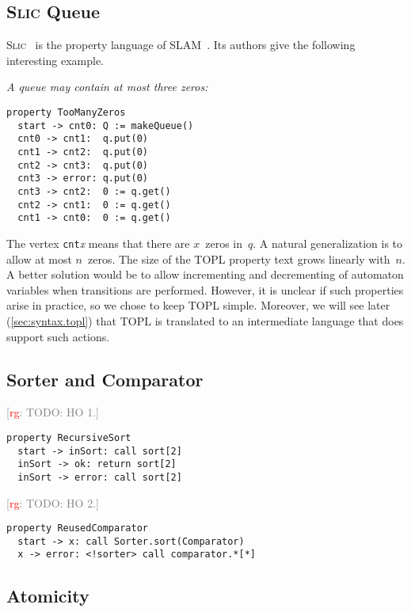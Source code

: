 \documentclass[preprint]{sigplanconf} %
\newcommand{\note}[2]{\textcolor{gray}{[\textcolor{red}{#1}: #2]}}
\newcommand{\rg}[1]{\note{rg}{#1}}
\newcommand{\delimitVerbatim}{\par\nobreak\smallskip\noindent}
\theoremstyle{definition}
\theoremstyle{remark}
\begin{document}
\subsection{\textsc{Slic} Queue} %

\textsc{Slic}~\cite{ball2002} is the property language of SLAM~\cite{dblp:conf/cav/ballr01}.
Its authors give the following interesting example.

\medskip\emph{A queue may contain at most three zeros:}
\delimitVerbatim
\begin{Verbatim}
property TooManyZeros
  start -> cnt0: Q := makeQueue()
  cnt0 -> cnt1:  q.put(0)
  cnt1 -> cnt2:  q.put(0)
  cnt2 -> cnt3:  q.put(0)
  cnt3 -> error: q.put(0)
  cnt3 -> cnt2:  0 := q.get()
  cnt2 -> cnt1:  0 := q.get()
  cnt1 -> cnt0:  0 := q.get()
\end{Verbatim}
\delimitVerbatim
The vertex \texttt{cnt}\textit{x} means that there are $x$~zeros in~$q$.
A natural generalization is to allow at most $n$~zeros.
The size of the TOPL property text grows linearly with~$n$.
A better solution would be to allow incrementing and decrementing of automaton variables when transitions are performed.
However, it is unclear if such properties arise in practice, so we chose to keep TOPL simple.
Moreover, we will see later (\autoref{sec:syntax.topl}) that TOPL is translated to an intermediate language that does support such actions.

\subsection{Sorter and Comparator}\label{sec:examples.sorter} %

\rg{TODO: HO 1.}
\par\medskip\noindent
\begin{Verbatim}
property RecursiveSort
  start -> inSort: call sort[2]
  inSort -> ok: return sort[2]
  inSort -> error: call sort[2]
\end{Verbatim}

\rg{TODO: HO 2.}
\par\medskip\noindent
\begin{Verbatim}
property ReusedComparator
  start -> x: call Sorter.sort(Comparator)
  x -> error: <!sorter> call comparator.*[*]
\end{Verbatim}

\subsection{Atomicity} %
\end{document}
